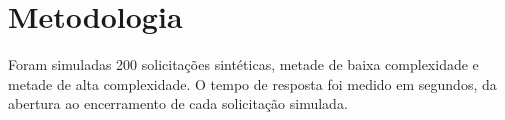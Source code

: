 \section{Metodologia}
Foram simuladas 200 solicitações sintéticas, metade de baixa complexidade e metade de alta complexidade.
O tempo de resposta foi medido em segundos, da abertura ao encerramento de cada solicitação simulada.
